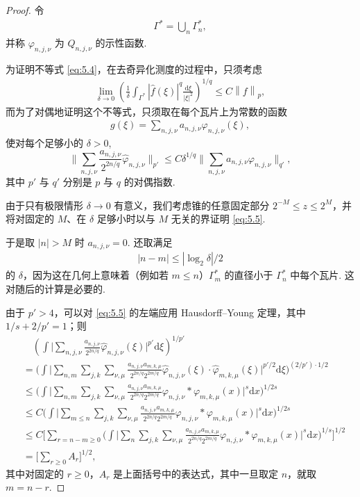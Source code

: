 \begin{proof}
令
\begin{align*}
  \Gamma^{*}=\bigcup_{n}\Gamma_{n}^{*},
\end{align*}
并称 $\varphi_{n,j,\nu}$ 为 $Q_{n,j,\nu}$ 的示性函数.

为证明不等式 \eqref{eq:5.4}，在去奇异化测度的过程中，只须考虑
\begin{align*}
  \lim_{\delta\rightarrow 0}\left(\frac{1}{\delta}\int_{\Gamma^{*}}|\widehat{f}(\xi)|^{q}\frac{\mathrm{d}\xi}{|\xi|^{2}}\right)^{1/q}
  \leq C\left\|f\right\|_{p},
\end{align*}
而为了对偶地证明这个不等式，只须取在每个瓦片上为常数的函数
\begin{align*}
  g(\xi)=\sum_{n,j,\nu}a_{n,j,\nu}\varphi_{n,j,\nu}(\xi),
\end{align*}
使对每个足够小的 $\delta > 0$,
\begin{equation}\label{eq:5.5}
  \Big\|\sum_{n,j,\nu}\frac{a_{n,j,\nu}}{2^{2n/q}}\widehat{\varphi}_{n,j,\nu}\Big\|_{p'}
  \leq C\delta^{1/q}\Big\|\sum_{n,j,\nu}a_{n,j,\nu}\varphi_{n,j,\nu}\Big\|_{q'},
\end{equation}
其中 $p'$ 与 $q'$ 分别是 $p$ 与 $q$ 的对偶指数.

由于只有极限情形 $\delta \to 0$ 有意义，我们考虑锥的任意固定部分 $2^{-M} \leq z \leq 2^M$，并将对固定的 $M$、在 $\delta$ 足够小时以与 $M$ 无关的界证明 \eqref{eq:5.5}.

于是取 $|n| > M$ 时 $a_{n,j,\nu} = 0$. 还取满足
\begin{align*}
  |n-m|\leq|\log_{2}\delta|/2
\end{align*}
的 $\delta$，因为这在几何上意味着（例如若 $m \leq n$）$\Gamma_m^*$ 的直径小于 $\Gamma_n^*$ 中每个瓦片. 这对随后的计算是必要的.

由于 $p' > 4$，可以对 \eqref{eq:5.5} 的左端应用 Hausdorff--Young 定理，其中 $1/s + 2/p' = 1$；则
\begin{align*}
  &\quad\left(\int\Big|\sum_{n,j,\nu}\frac{a_{n,j,\nu}}{2^{2n/q}}\widehat{\varphi}_{n,j,\nu}(\xi)\Big|^{p'}\mathrm{d}\xi\right)^{1/p'}\\
  &=\Big(\int\Big|\sum_{n,m}\sum_{j,k}\sum_{\nu,\mu}\frac{a_{n,j,\nu}a_{m,k,\mu}}{2^{2n/q}2^{2m/q}}
   \widehat{\varphi}_{n,j,\nu}(\xi)\cdot\widehat{\varphi}_{m,k,\mu}(\xi)\Big|^{p'/2}\mathrm{d}\xi\Big)^{(2/p')\cdot 1/2}\\
  &\leq\Big(\int\Big|\sum_{n,m}\sum_{j,k}\sum_{\nu,\mu}\frac{a_{n,j,\nu}a_{m,k,\mu}}{2^{2n/q}2^{2m/q}}
   \varphi_{n,j,\nu}*\varphi_{m,k,\mu}(x)\Big|^{s}\mathrm{d}x\Big)^{1/2s}\\
  &\leq C\Big(\int\Big|\sum_{m\leq n}\sum_{j,k}\sum_{\nu,\mu}\frac{a_{n,j,\nu}a_{m,k,\mu}}{2^{2n/q}2^{2m/q}}
   \varphi_{n,j,\nu}*\varphi_{m,k,\mu}(x)\Big|^{s}\mathrm{d}x\Big)^{1/2s}\\
  &\leq C\Big[\sum_{r=n-m\geq 0}\Big(\int\Big|\sum_{n}\sum_{j,k}\sum_{\nu,\mu}\frac{a_{n,j,\nu}a_{m,k,\mu}}{2^{2n/q}2^{2m/q}}
   \varphi_{n,j,\nu}*\varphi_{m,k,\mu}(x)\Big|^{s}\mathrm{d}x\Big)^{1/s}\Big]^{1/2}\\
  &=\Big[\sum_{r\geq 0}A_{r}\Big]^{1/2},
\end{align*}
其中对固定的 $r \geq 0$，$A_r$ 是上面括号中的表达式，其中一旦取定 $n$，就取 $m = n - r$.


\end{proof}

